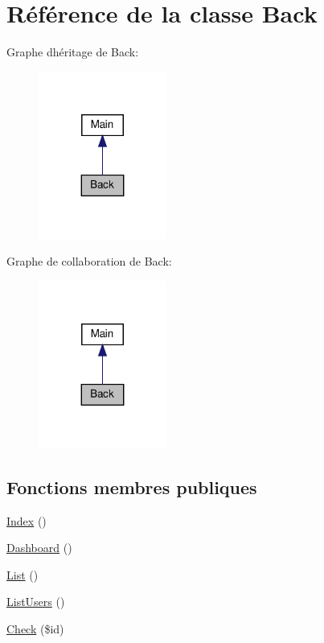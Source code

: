 \hypertarget{class_src_1_1_controllers_1_1_back}{}\section{Référence de la classe Back}
\label{class_src_1_1_controllers_1_1_back}


Graphe d\textquotesingle{}héritage de Back\+:\nopagebreak
\begin{figure}[H]
\begin{center}
\leavevmode
\includegraphics[width=119pt]{d2/d0f/class_src_1_1_controllers_1_1_back__inherit__graph}
\end{center}
\end{figure}


Graphe de collaboration de Back\+:\nopagebreak
\begin{figure}[H]
\begin{center}
\leavevmode
\includegraphics[width=119pt]{dd/db5/class_src_1_1_controllers_1_1_back__coll__graph}
\end{center}
\end{figure}
\subsection*{Fonctions membres publiques}
\begin{DoxyCompactItemize}
\item 
\hyperlink{class_src_1_1_controllers_1_1_back_ac36db983080e1b0934908febca5de2d9}{Index} ()
\item 
\hyperlink{class_src_1_1_controllers_1_1_back_a405a66825259e2e811a2011a61c2beff}{Dashboard} ()
\item 
\hyperlink{class_src_1_1_controllers_1_1_back_a17e6c90f14225bdac5c65ed915b0a2f6}{List} ()
\item 
\hyperlink{class_src_1_1_controllers_1_1_back_abfd4f6736a8cd4dc4fa1e012996f4a23}{List\+Users} ()
\item 
\hyperlink{class_src_1_1_controllers_1_1_back_a384a1ec9e22b88a73de48023bb2bbf4f}{Check} (\$id)
\end{DoxyCompactItemize}
